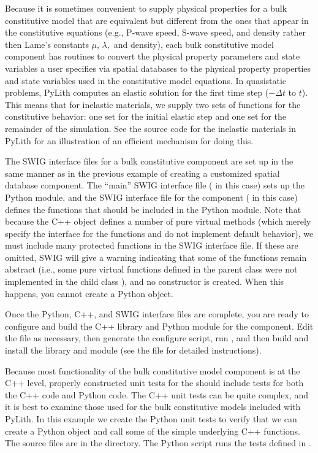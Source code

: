 Because it is sometimes convenient to supply physical properties for
a bulk constitutive model that are equivalent but different from the
ones that appear in the constitutive equations (e.g., P-wave speed,
S-wave speed, and density rather then Lame's constants $\mu$, $\lambda,$
and density), each bulk constitutive model component has routines
to convert the physical property parameters and state variables a
user specifies via spatial databases to the physical property properties
and state variables used in the constitutive model equations. In quasistatic
problems, PyLith computes an elastic solution for the first time step
($-\Delta t$ to $t$). This means that for inelastic materials, we
supply two sets of functions for the constitutive behavior: one set
for the initial elastic step and one set for the remainder of the
simulation. See the source code for the inelastic materials in PyLith
for an illustration of an efficient mechanism for doing this.

The SWIG interface files for a bulk constitutive component are set up
in the same manner as in the previous example of creating a customized
spatial database component. The ``main'' SWIG interface file
( in this case) sets up the Python
module, and the SWIG interface file for the component
( in this case) defines the functions
that should be included in the Python module. Note that because the
C++  object defines a number of pure virtual
methods (which merely specify the interface for the functions and do
not implement default behavior), we must include many protected
functions in the SWIG interface file. If these are omitted, SWIG will
give a warning indicating that some of the functions remain abstract
(i.e., some pure virtual functions defined in the parent class
 were not implemented in the child class
), and no constructor is created. When this
happens, you cannot create a  Python object.

Once the Python, C++, and SWIG interface files are complete, you are
ready to configure and build the C++ library and Python module for the
component. Edit the  file as necessary, then
generate the configure script, run , and then
build and install the library and module (see the 
file for detailed instructions).

Because most functionality of the bulk constitutive model component is
at the C++ level, properly constructed unit tests for the
 should include tests for both the C++ code and
Python code. The C++ unit tests can be quite complex, and it is best
to examine those used for the bulk constitutive models included with
PyLith. In this example we create the Python unit tests to verify that
we can create a  Python object and call some
of the simple underlying C++ functions.  The source files are in the
 directory.  The
 Python script runs the tests defined in
.

